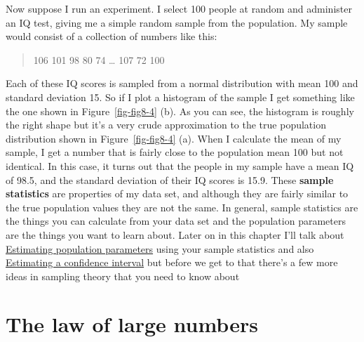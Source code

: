 \documentclass[
  a4paper,
]{book}
\begin{document}
Now suppose I run an experiment. I select 100 people at random and
administer an IQ test, giving me a simple random sample from the
population. My sample would consist of a collection of numbers like
this:

\begin{quote}
106 101 98 80 74 \ldots{} 107 72 100
\end{quote}

Each of these IQ scores is sampled from a normal distribution with mean
100 and standard deviation 15. So if I plot a histogram of the sample I
get something like the one shown in Figure~\ref{fig-fig8-4} (b). As you
can see, the histogram is roughly the right shape but it's a very crude
approximation to the true population distribution shown in
Figure~\ref{fig-fig8-4} (a). When I calculate the mean of my sample, I
get a number that is fairly close to the population mean 100 but not
identical. In this case, it turns out that the people in my sample have
a mean IQ of 98.5, and the standard deviation of their IQ scores is
15.9. These \textbf{sample statistics} are properties of my data set,
and although they are fairly similar to the true population values they
are not the same. In general, sample statistics are the things you can
calculate from your data set and the population parameters are the
things you want to learn about. Later on in this chapter I'll talk about
\protect\hyperlink{estimating-population-parameters}{Estimating
population parameters} using your sample statistics and also
\protect\hyperlink{sec-Estimating-a-confidence-interval}{Estimating a
confidence interval} but before we get to that there's a few more ideas
in sampling theory that you need to know about

\hypertarget{the-law-of-large-numbers}{%
\section{The law of large numbers}\label{the-law-of-large-numbers}}
\end{document}
